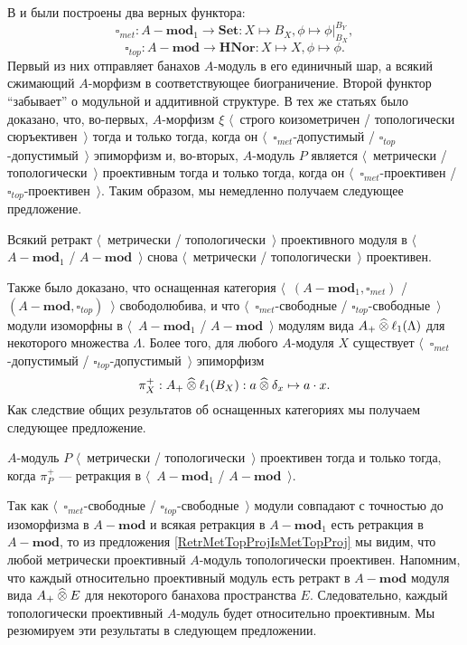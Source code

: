 В \cite{HelMetrFrQMod} и \cite{ShtTopFrClassicQuantMod} были построены два верных функтора: 
$$
\square_{met}:A-\mathbf{mod}_1\to\mathbf{Set}:X\mapsto B_X,\phi\mapsto\phi|_{B_X}^{B_Y},
$$
$$
\square_{top}:A-\mathbf{mod}\to\mathbf{HNor}:X\mapsto X,\phi\mapsto\phi.
$$
Первый из них отправляет банахов $A$-модуль в его единичный шар, а всякий сжимающий $A$-морфизм в соответствующее биограничение. Второй функтор ``забывает'' о модульной и аддитивной структуре.
В тех же статьях было доказано, что, во-первых, $A$-морфизм $\xi$ $\langle$~строго коизометричен / топологически сюръективен~$\rangle$ тогда и только тогда, когда он $\langle$~$\square_{met}$-допустимый / $\square_{top}$-допустимый~$\rangle$ эпиморфизм и, во-вторых, $A$-модуль $P$ является $\langle$~метрически / топологически~$\rangle$ проективным тогда и только тогда, когда он $\langle$~$\square_{met}$-проективен / $\square_{top}$-проективен~$\rangle$. Таким образом, мы немедленно получаем следующее предложение.

\begin{proposition}\label{RetrMetTopProjIsMetTopProj} Всякий ретракт $\langle$~метрически / топологически~$\rangle$ проективного модуля в $\langle$~$A-\mathbf{mod}_1$ / $A-\mathbf{mod}$~$\rangle$ снова $\langle$~метрически / топологически~$\rangle$ проективен.
\end{proposition}

Также было доказано, что оснащенная категория $\langle$~$(A-\mathbf{mod}_1,\square_{met})$ / $(A-\mathbf{mod},\square_{top})$~$\rangle$ свободолюбива, и что $\langle$~$\square_{met}$-свободные / $\square_{top}$-свободные~$\rangle$ модули изоморфны в $\langle$~$A-\mathbf{mod}_1$ / $A-\mathbf{mod}$~$\rangle$ модулям вида $A_+\mathbin{\widehat{\otimes}} \ell_1(\Lambda)$ для некоторого множества $\Lambda$. Более того, для любого $A$-модуля $X$ существует $\langle$~$\square_{met}$-допустимый / $\square_{top}$-допустимый~$\rangle$ эпиморфизм
$$
\pi_X^+:A_+\mathbin{\widehat{\otimes}} \ell_1(B_X):a\mathbin{\widehat{\otimes}} \delta_x\mapsto a\cdot x.
$$
Как следствие общих результатов об оснащенных категориях мы получаем следующее предложение.

\begin{proposition}\label{MetTopProjModViaCanonicMorph}
$A$-модуль $P$ $\langle$~метрически / топологически~$\rangle$ проективен тогда и только тогда, когда  $\pi_P^+$ --- ретракция в $\langle$~$A-\mathbf{mod}_1$ / $A-\mathbf{mod}$~$\rangle$.
\end{proposition}

Так как $\langle$~$\square_{met}$-свободные / $\square_{top}$-свободные~$\rangle$ модули совпадают с точностью до изоморфизма в $A-\mathbf{mod}$ и всякая ретракция в $A-\mathbf{mod}_1$ есть ретракция в $A-\mathbf{mod}$, то из предложения \ref{RetrMetTopProjIsMetTopProj} мы видим, что любой метрически проективный $A$-модуль топологически проективен. Напомним, что каждый относительно проективный модуль есть ретракт в $A-\mathbf{mod}$ модуля вида $A_+\mathbin{\widehat{\otimes}} E$ для некоторого банахова пространства $E$. Следовательно, каждый топологически проективный $A$-модуль будет относительно проективным. Мы резюмируем эти результаты в следующем предложении.

